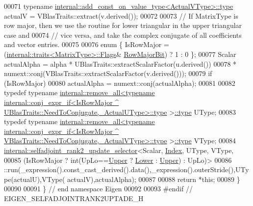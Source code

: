 \begin{DoxyCode}
00071   \textcolor{keyword}{typename} \hyperlink{group___sparse_core___module}{internal::add\_const\_on\_value\_type<ActualVType>::type}
       actualV = VBlasTraits::extract(v.derived());
00072 
00073   \textcolor{comment}{// If MatrixType is row major, then we use the routine for lower triangular in the upper triangular case
       and}
00074   \textcolor{comment}{// vice versa, and take the complex conjugate of all coefficients and vector entries.}
00075 
00076   \textcolor{keyword}{enum} \{ IsRowMajor = (\hyperlink{struct_eigen_1_1internal_1_1traits}{internal::traits<MatrixType>::Flags}&
      \hyperlink{group__flags_gae4f56c2a60bbe4bd2e44c5b19cbe8762}{RowMajorBit}) ? 1 : 0 \};
00077   Scalar actualAlpha = alpha * UBlasTraits::extractScalarFactor(u.derived())
00078                              * numext::conj(VBlasTraits::extractScalarFactor(v.derived()));
00079   \textcolor{keywordflow}{if} (IsRowMajor)
00080     actualAlpha = numext::conj(actualAlpha);
00081 
00082   \textcolor{keyword}{typedef} \textcolor{keyword}{typename} 
      \hyperlink{struct_eigen_1_1internal_1_1remove__all}{internal::remove\_all<typename internal::conj\_expr\_if<IsRowMajor ^
       UBlasTraits::NeedToConjugate,\_ActualUType>::type}
      >\hyperlink{group___sparse_core___module}{::type} UType;
00083   \textcolor{keyword}{typedef} \textcolor{keyword}{typename} 
      \hyperlink{struct_eigen_1_1internal_1_1remove__all}{internal::remove\_all<typename internal::conj\_expr\_if<IsRowMajor ^
       VBlasTraits::NeedToConjugate,\_ActualVType>::type}
      >\hyperlink{group___sparse_core___module}{::type} VType;
00084   \hyperlink{struct_eigen_1_1internal_1_1selfadjoint__rank2__update__selector}{internal::selfadjoint\_rank2\_update\_selector}<Scalar, 
      \hyperlink{namespace_eigen_a62e77e0933482dafde8fe197d9a2cfde}{Index}, UType, VType,
00085     (IsRowMajor ? int(UpLo==\hyperlink{group__enums_gga39e3366ff5554d731e7dc8bb642f83cda6bcb58be3b8b8ec84859ce0c5ac0aaec}{Upper} ? \hyperlink{group__enums_gga39e3366ff5554d731e7dc8bb642f83cda891792b8ed394f7607ab16dd716f60e6}{Lower} : \hyperlink{group__enums_gga39e3366ff5554d731e7dc8bb642f83cda6bcb58be3b8b8ec84859ce0c5ac0aaec}{Upper}) : UpLo)>
00086     ::run(\_expression().const\_cast\_derived().data(),\_expression().outerStride(),UType(actualU),VType(
      actualV),actualAlpha);
00087 
00088   \textcolor{keywordflow}{return} *\textcolor{keyword}{this};
00089 \}
00090 
00091 \} \textcolor{comment}{// end namespace Eigen}
00092 
00093 \textcolor{preprocessor}{#endif // EIGEN\_SELFADJOINTRANK2UPTADE\_H}
\end{DoxyCode}
